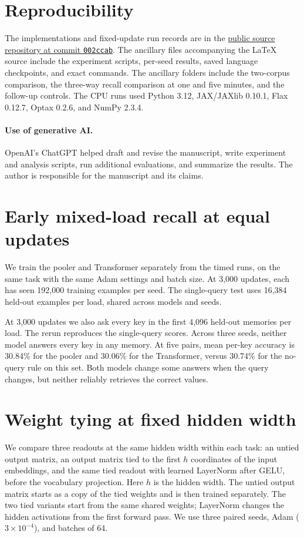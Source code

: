 \documentclass[11pt]{article}
\begin{document}
\section*{Reproducibility}
The implementations and fixed-update run records are in the \href{https://github.com/ivandustin/llm/tree/002ccabcb90cef25ab25678a90fea81e36876651}{public source repository at commit \texttt{002ccab}}. The ancillary files accompanying the \LaTeX{} source include the experiment scripts, per-seed results, saved language checkpoints, and exact commands. The ancillary folders include the two-corpus comparison, the three-way recall comparison at one and five minutes, and the follow-up controls. The CPU runs used Python 3.12, JAX/JAXlib 0.10.1, Flax 0.12.7, Optax 0.2.6, and NumPy 2.3.4.

\paragraph{Use of generative AI.}
OpenAI's ChatGPT helped draft and revise the manuscript, write experiment and analysis scripts, run additional evaluations, and summarize the results. The author is responsible for the manuscript and its claims.

\appendix
\section{Early mixed-load recall at equal updates}
\label{app:early-recall}
We train the pooler and Transformer separately from the timed runs, on the same task with the same Adam settings and batch size. At 3,000 updates, each has seen 192,000 training examples per seed. The single-query test uses 16,384 held-out examples per load, shared across models and seeds.



At 3,000 updates we also ask every key in the first 4,096 held-out memories per load. The rerun reproduces the single-query scores. Across three seeds, neither model answers every key in any memory. At five pairs, mean per-key accuracy is 30.84\% for the pooler and 30.06\% for the Transformer, versus 30.74\% for the no-query rule on this set. Both models change some answers when the query changes, but neither reliably retrieves the correct values.

\section{Weight tying at fixed hidden width}
\label{app:weight-tying}
We compare three readouts at the same hidden width within each task: an untied output matrix, an output matrix tied to the first $h$ coordinates of the input embeddings, and the same tied readout with learned LayerNorm after GELU, before the vocabulary projection. Here $h$ is the hidden width. The untied output matrix starts as a copy of the tied weights and is then trained separately. The two tied variants start from the same shared weights; LayerNorm changes the hidden activations from the first forward pass. We use three paired seeds, Adam ($3\times10^{-4}$), and batches of 64.
\end{document}

